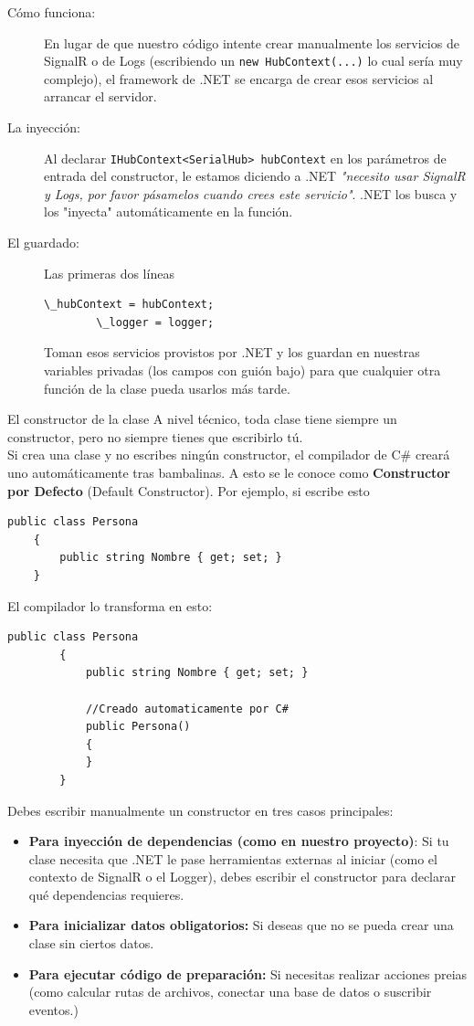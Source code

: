 \documentclass[
10pt, %
a4paper, %
oneside, %
headinclude,footinclude, %
BCOR5mm, %
]{scrartcl}
\begin{document}
\begin{description}
	\item[Cómo funciona:] En lugar de que nuestro código intente crear manualmente los servicios de SignalR o de Logs (escribiendo un \texttt{new HubContext(...)} lo cual sería muy complejo), el framework de .NET se encarga de crear esos servicios al arrancar el servidor.
	\item[La inyección:] Al declarar \texttt{IHubContext<SerialHub> hubContext} en los parámetros de entrada del constructor, le estamos diciendo a .NET \textit{"necesito usar SignalR y Logs, por favor pásamelos cuando crees este servicio"}. .NET los busca y los "inyecta" automáticamente en la función.
	\item[El guardado:] Las primeras dos líneas
	\begin{lstlisting}[style=csharpStyle]
		\_hubContext = hubContext;
		\_logger = logger;
	\end{lstlisting}
	Toman esos servicios provistos por .NET y los guardan en nuestras variables privadas (los campos con guión bajo) para que cualquier otra función de la clase pueda usarlos más tarde.
\end{description}

\begin{InfoBox}{El constructor de la clase} 
	A nivel técnico, toda clase tiene siempre un constructor, pero no siempre tienes que escribirlo tú. \\
	
	Si crea una clase y no escribes ningún constructor, el compilador de C\# creará uno automáticamente tras bambalinas. A esto se le conoce como \textbf{Constructor por Defecto} (Default Constructor). Por ejemplo, si escribe esto
	\begin{lstlisting}[style=csharpStyle]
	public class Persona
	{
		public string Nombre { get; set; }
	}
	\end{lstlisting}
	El compilador lo transforma en esto:
	\begin{lstlisting}[style=csharpStyle]
		public class Persona
		{
			public string Nombre { get; set; }
			
			//Creado automaticamente por C#
			public Persona()
			{
			}
		}
	\end{lstlisting}
	Debes escribir manualmente un constructor en tres casos principales:
	\begin{itemize}
		\item \textbf{Para inyección de dependencias (como en nuestro proyecto)}: Si tu clase necesita que .NET le pase herramientas externas al iniciar (como el contexto de SignalR o el Logger), debes escribir el constructor para declarar qué dependencias requieres.
		\item \textbf{Para inicializar datos obligatorios:} Si deseas que no se pueda crear una clase sin ciertos datos.
		\item \textbf{Para ejecutar código de preparación:} Si necesitas realizar acciones preias (como calcular rutas de archivos, conectar una base de datos o suscribir eventos.)
	\end{itemize}
\end{InfoBox}
\end{document}
